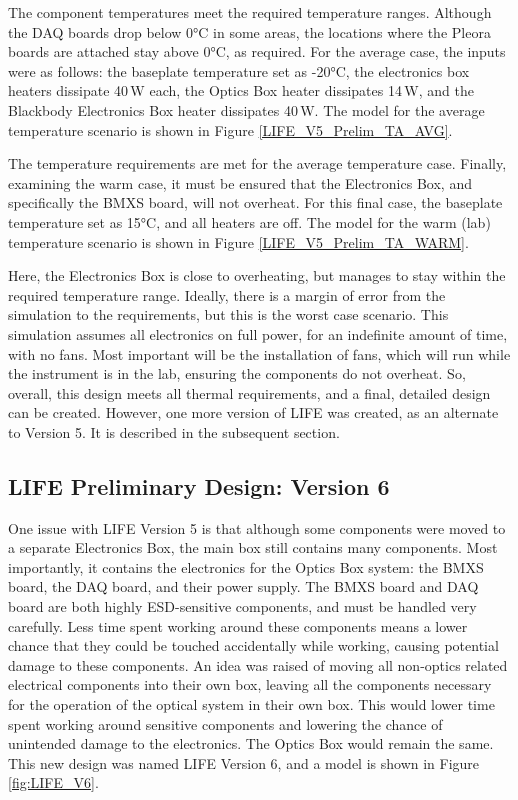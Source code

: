 The component temperatures meet the required temperature ranges. Although the DAQ boards drop below 0°C in some areas, the locations where the Pleora boards are attached stay above 0°C, as required. For the average case, the inputs were as follows: the baseplate temperature set as -20°C, the electronics box heaters dissipate 40\,W each, the Optics Box heater dissipates 14\,W, and the Blackbody Electronics Box heater dissipates 40\,W. The model for the average temperature scenario is shown in Figure \ref{LIFE_V5_Prelim_TA_AVG}.

The temperature requirements are met for the average temperature case. Finally, examining the warm case, it must be ensured that the Electronics Box, and specifically the BMXS board, will not overheat. For this final case, the baseplate temperature set as 15°C, and all heaters are off. The model for the warm (lab) temperature scenario is shown in Figure \ref{LIFE_V5_Prelim_TA_WARM}.

Here, the Electronics Box is close to overheating, but manages to stay within the required temperature range. Ideally, there is a margin of error from the simulation to the requirements, but this is the worst case scenario. This simulation assumes all electronics on full power, for an indefinite amount of time, with no fans. Most important will be the installation of fans, which will run while the instrument is in the lab, ensuring the components do not overheat. So, overall, this design meets all thermal requirements, and a final, detailed design can be created. However, one more version of LIFE was created, as an alternate to Version 5. It is described in the subsequent section.

\subsection{LIFE Preliminary Design: Version 6}
One issue with LIFE Version 5 is that although some components were moved to a separate Electronics Box, the main box still contains many components. Most importantly, it contains the electronics for the Optics Box system: the BMXS board, the DAQ board, and their power supply. The BMXS board and DAQ board are both highly ESD-sensitive components, and must be handled very carefully. Less time spent working around these components means a lower chance that they could be touched accidentally while working, causing potential damage to these components. An idea was raised of moving all non-optics related electrical components into their own box, leaving all the components necessary for the operation of the optical system in their own box. This would lower time spent working around sensitive components and lowering the chance of unintended damage to the electronics. The Optics Box would remain the same. This new design was named LIFE Version 6, and a model is shown in Figure \ref{fig:LIFE_V6}.

